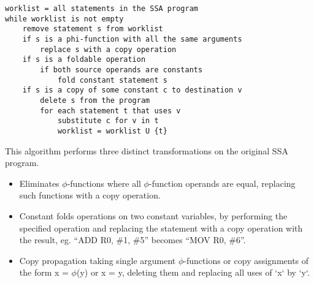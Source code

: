 \documentclass[a4paper,10pt]{report}
\begin{document}
\begin{verbatim}
worklist = all statements in the SSA program
while worklist is not empty
    remove statement s from worklist
    if s is a phi-function with all the same arguments
        replace s with a copy operation
    if s is a foldable operation
        if both source operands are constants
            fold constant statement s
    if s is a copy of some constant c to destination v
        delete s from the program
        for each statement t that uses v
            substitute c for v in t
            worklist = worklist U {t}
\end{verbatim}
This algorithm performs three distinct transformations on the original SSA program.
\begin{itemize}
 \item Eliminates \(\phi\)-functions where all \(\phi\)-function operands are equal, replacing such functions with a copy operation.
 \item Constant folds operations on two constant variables, by performing the specified operation and replacing the statement
        with a copy operation with the result, eg. ``ADD R0, \#1, \#5'' becomes ``MOV R0, \#6''.
 \item Copy propagation taking single argument \(\phi\)-functions or copy assignments of the form x = \(\phi\)(y) or x = y, 
        deleting them and replacing all uses of `x` by `y`.
\end{itemize}
\end{document}
